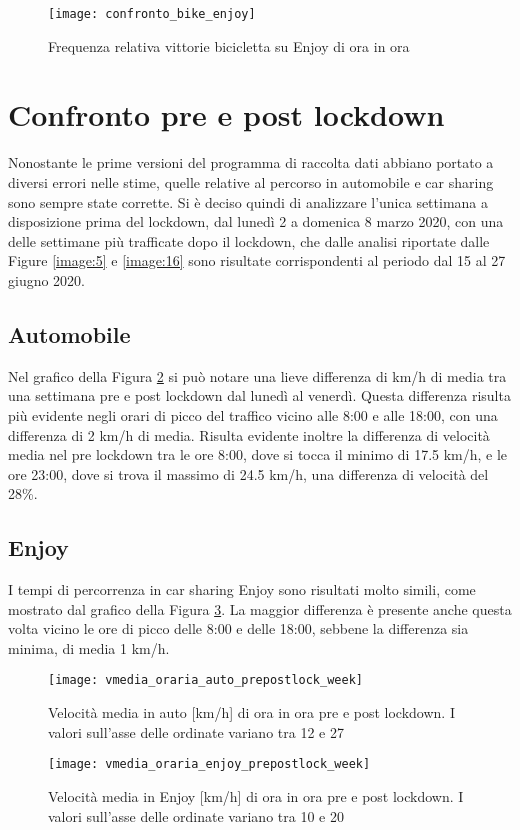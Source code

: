 \begin{figure}[H]
	\centering
	\texttt{[image: confronto\_bike\_enjoy]}
	\caption{Frequenza relativa vittorie bicicletta su Enjoy di ora in ora}
	\label{image:14}
\end{figure}

\pagebreak

\section{Confronto pre e post lockdown}

Nonostante le prime versioni del programma di raccolta dati abbiano portato a diversi errori nelle stime, quelle relative al percorso in automobile e car sharing sono sempre state corrette. Si è deciso quindi di analizzare l'unica settimana a disposizione prima del lockdown, dal lunedì 2 a domenica 8 marzo 2020, con una delle settimane più trafficate dopo il lockdown, che dalle analisi riportate dalle Figure \ref{image:5} e \ref{image:16} sono risultate corrispondenti al periodo dal 15 al 27 giugno 2020.

\subsection{Automobile}

Nel grafico della Figura \ref{image:22} si può notare una lieve differenza di km/h di media tra una settimana pre e post lockdown dal lunedì al venerdì. Questa differenza risulta più evidente negli orari di picco del traffico vicino alle 8:00 e alle 18:00, con una differenza di 2 km/h di media. Risulta evidente inoltre la differenza di velocità media nel pre lockdown tra le ore 8:00, dove si tocca il minimo di 17.5 km/h, e le ore 23:00, dove si trova il massimo di 24.5 km/h, una differenza di velocità del 28\%.

\subsection{Enjoy}

I tempi di percorrenza in car sharing Enjoy sono risultati molto simili, come mostrato dal grafico della Figura \ref{image:24}. La maggior differenza è presente anche questa volta vicino le ore di picco delle 8:00 e delle 18:00, sebbene la differenza sia minima, di media 1 km/h.

\begin{figure}[H]
	\centering
	\texttt{[image: vmedia\_oraria\_auto\_prepostlock\_week]}
	\caption{Velocità media in auto [km/h] di ora in ora pre e post lockdown. I valori sull'asse delle ordinate variano tra 12 e 27}
	\label{image:22}
\end{figure}

\begin{figure}[H]
	\centering
	\texttt{[image: vmedia\_oraria\_enjoy\_prepostlock\_week]}
	\caption{Velocità media in Enjoy [km/h] di ora in ora pre e post lockdown. I valori sull'asse delle ordinate variano tra 10 e 20}
	\label{image:24}
\end{figure}












